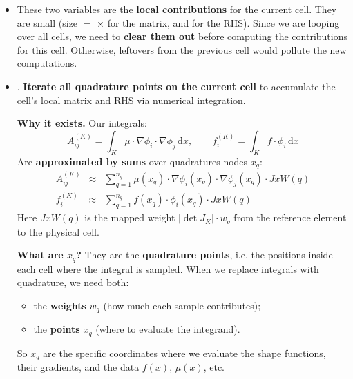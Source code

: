\begin{itemize}
    \item {} These two variables are the \textbf{local contributions} for the current cell. They are small (size $=$  $\times$  for the matrix, and  for the RHS). Since we are looping over all cells, we need to \textbf{clear them out} before computing the contributions for this cell. Otherwise, leftovers from the previous cell would pollute the new computations.
    

    \item {}. \textbf{Iterate all quadrature points on the current cell} to accumulate the cell's local matrix and RHS via numerical integration.
    
    \textcolor{Green3}{ \textbf{Why it exists.}} Our integrals:
    \begin{equation*}
        A^{(K)}_{ij} = \int_K \mu\cdot \nabla\phi_{i} \cdot \nabla\phi_j\,\mathrm{d}x, \qquad f^{(K)}_{i} = \int_K f\cdot \phi_i\,\mathrm{d}x
    \end{equation*}
    Are \textbf{approximated by sums} over quadratures nodes $x_{q}$:
    \begin{equation*}
        \begin{array}{rcl}
            A^{(K)}_{ij} &\approx& \displaystyle\sum_{q=1}^{n_q}\mu(x_q)\cdot \nabla\phi_i(x_q) \cdot \nabla\phi_j(x_q) \cdot JxW(q) \\[.5em]
            f^{(K)}_{i} &\approx& \displaystyle\sum_{q=1}^{n_q} f(x_q) \cdot \phi_{i}(x_{q}) \cdot JxW(q)
        \end{array}
    \end{equation*}
    Here $JxW(q)$ is the mapped weight $\left|\det J_{K}\right| \cdot w_{q}$ from the reference element to the physical cell.

    \textcolor{Green3}{ \textbf{What are $x_q$?}} They are the \textbf{quadrature points}, i.e. the positions inside each cell where the integral is sampled. When we replace integrals with quadrature, we need both:
    \begin{itemize}
        \item the \textbf{weights} $w_q$ (how much each sample contributes);
        \item the \textbf{points} $x_q$ (where to evaluate the integrand).
    \end{itemize}
    So $x_q$ are the specific coordinates where we evaluate the shape functions, their gradients, and the data $f(x)$, $\mu(x)$, etc.


\end{itemize}
